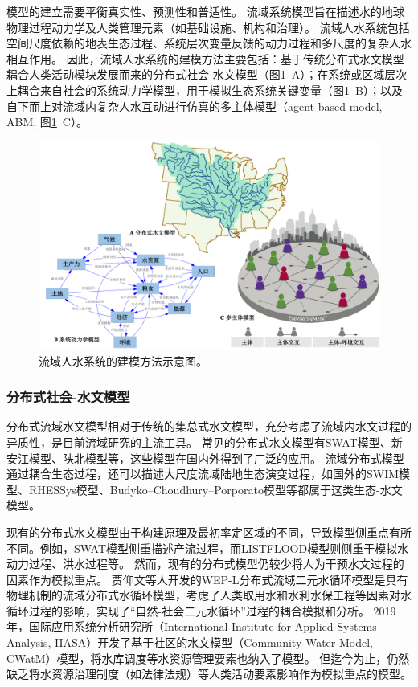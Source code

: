 
模型的建立需要平衡真实性、预测性和普适性\cite{gunderson2017}。
流域系统模型旨在描述水的地球物理过程动力学及人类管理元素（如基础设施、机构和治理）\cite{hadjimichael2020}。
流域人水系统包括空间尺度依赖的地表生态过程、系统层次变量反馈的动力过程和多尺度的复杂人水相互作用\cite{bodin2017b,sayles2017,sayles2019}。
因此，流域人水系统的建模方法主要包括：基于传统分布式水文模型耦合人类活动模块发展而来的分布式社会-水文模型（图\ref{ch1:fig:models}~A）；在系统或区域层次上耦合来自社会的系统动力学模型，用于模拟生态系统关键变量（图\ref{ch1:fig:models}~B）；以及自下而上对流域内复杂人水互动进行仿真的多主体模型（agent-based model, ABM, 图\ref{ch1:fig:models}~C）。

\begin{figure}[!ht]
    \centering
    \includegraphics[width=\textwidth]{img/ch1/ch1_models.png}
    \caption[流域人水系统的建模方法示意图]{流域人水系统的建模方法示意图。}\label{ch1:fig:models}
\end{figure}

\subsubsection{分布式社会-水文模型}

分布式流域水文模型相对于传统的集总式水文模型，充分考虑了流域内水文过程的异质性\cite{wangzhonggen2003}，是目前流域研究的主流工具。
常见的分布式水文模型有SWAT模型、新安江模型、陕北模型等，这些模型在国内外得到了广泛的应用\cite{arnold1998,xiajun2003,ficklin2009}。
流域分布式模型通过耦合生态过程，还可以描述大尺度流域陆地生态演变过程，如国外的SWIM模型\cite{krysanova2005}、RHESSys模型\cite{tague2004}、Budyko–Choudhury–Porporato模型\cite{donohue2012}等都属于这类生态-水文模型。

现有的分布式水文模型由于构建原理及最初率定区域的不同，导致模型侧重点有所不同。例如，SWAT模型侧重描述产流过程\cite{wangzhonggen2003a}，而LISTFLOOD模型则侧重于模拟水动力过程、洪水过程等\cite{zengzhaoyang2017}。
然而，现有的分布式模型仍较少将人为干预水文过程的因素作为模拟重点。
贾仰文等人开发的WEP-L分布式流域二元水循环模型是具有物理机制的流域分布式水循环模型，考虑了人类取用水和水利水保工程等因素对水循环过程的影响，实现了“自然-社会二元水循环”过程的耦合模拟和分析\cite{jia2010}。
2019年，国际应用系统分析研究所（International Institute for Applied Systems Analysis, IIASA）开发了基于社区的水文模型（Community Water Model, CWatM）模型，将水库调度等水资源管理要素也纳入了模型\cite{burek2020}。
但迄今为止，仍然缺乏将水资源治理制度（如法律法规）等人类活动要素影响作为模拟重点的模型。

